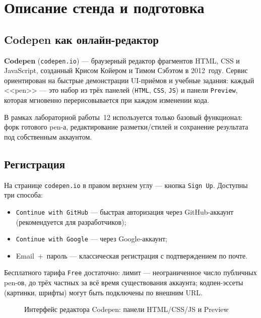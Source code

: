 \chapter{Описание стенда и подготовка}
\label{ch:stand}

\section{Codepen как онлайн-редактор}

\textbf{Codepen} (\texttt{codepen.io}) --- браузерный редактор фрагментов
HTML, CSS и JavaScript, созданный Крисом Койером и Тимом Сэбэтом в
2012~году. Сервис ориентирован на быстрые демонстрации UI-приёмов и
учебные задания: каждый <<pen>> --- это набор из трёх панелей
(\texttt{HTML}, \texttt{CSS}, \texttt{JS}) и панели \texttt{Preview},
которая мгновенно перерисовывается при каждом изменении кода.

В рамках лабораторной работы~12 используется только базовый функционал:
форк готового pen-а, редактирование разметки/стилей и сохранение
результата под собственным аккаунтом.

\section{Регистрация}

На странице \texttt{codepen.io} в правом верхнем углу --- кнопка
\texttt{Sign~Up}. Доступны три способа:
\begin{itemize}
  \item \texttt{Continue~with~GitHub} --- быстрая авторизация через
        GitHub-аккаунт (рекомендуется для разработчиков);
  \item \texttt{Continue~with~Google} --- через Google-аккаунт;
  \item Email~+~пароль --- классическая регистрация с подтверждением
        по почте.
\end{itemize}

Бесплатного тарифа \texttt{Free} достаточно: лимит --- неограниченное
число публичных pen-ов, до трёх частных за всё время существования
аккаунта; кодпен-эссеты (картинки, шрифты) могут быть подключены по
внешним URL.

\begin{figure}[h]
  \centering
  \caption{Интерфейс редактора Codepen: панели HTML/CSS/JS и Preview}
  \label{fig:codepen_ui}
\end{figure}

